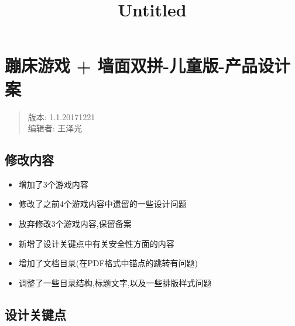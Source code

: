 \documentclass[11pt]{article}
\title{Untitled}
\providecommand{\tightlist}{%
      \setlength{\itemsep}{0pt}\setlength{\parskip}{0pt}}
\begin{document}
    
    
    \maketitle
    
    

    
    \section{蹦床游戏 +
墙面双拼-儿童版-产品设计案}\label{ux8e66ux5e8aux6e38ux620f-ux5899ux9762ux53ccux62fc-ux513fux7ae5ux7248-ux4ea7ux54c1ux8bbeux8ba1ux6848}

    \begin{quote}
版本: 1.1.20171221\\
编辑者: 王泽光
\end{quote}

    \subsection{修改内容}\label{ux4feeux6539ux5185ux5bb9}

    \begin{itemize}
\tightlist
\item
  增加了3个游戏内容
\item
  修改了之前4个游戏内容中遗留的一些设计问题
\item
  放弃修改3个游戏内容,保留备案
\item
  新增了设计关键点中有关安全性方面的内容
\item
  增加了文档目录(在PDF格式中锚点的跳转有问题)
\item
  调整了一些目录结构,标题文字,以及一些排版样式问题
\end{itemize}

    \subsection{设计关键点}\label{ux8bbeux8ba1ux5173ux952eux70b9}
\end{document}
